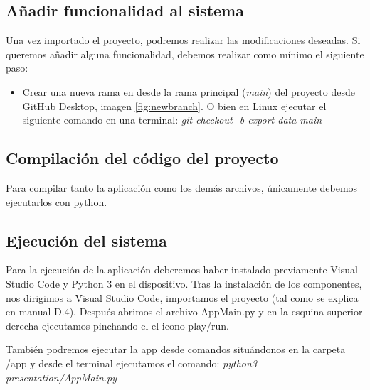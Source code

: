 \subsection{Añadir funcionalidad al sistema}

Una vez importado el proyecto, podremos realizar las modificaciones deseadas.
Si queremos añadir alguna funcionalidad, debemos realizar como mínimo el siguiente paso:

\begin{itemize}
    \item Crear una nueva rama en desde la rama principal (\textit{main}) del proyecto desde GitHub Desktop, imagen \ref{fig:newbranch}.
    O bien en Linux ejecutar el siguiente comando en una terminal:
        \textit{git checkout -b export-data main}
\end{itemize}

\subsection{Compilación del código del proyecto}

Para compilar tanto la aplicación como los demás archivos, únicamente debemos ejecutarlos con python.

\subsection{Ejecución del sistema}

Para la ejecución de la aplicación  deberemos haber instalado previamente
Visual Studio Code y Python 3 en el dispositivo. Tras la instalación de los componentes, nos dirigimos a Visual Studio Code, importamos
el proyecto (tal como se explica en manual D.4). Después abrimos el
archivo AppMain.py y en la esquina superior derecha ejecutamos pinchando
el el icono play/run. 


También podremos ejecutar la app desde comandos situándonos en
la carpeta /app y desde el terminal ejecutamos el comando:
\textit{python3 presentation/AppMain.py}